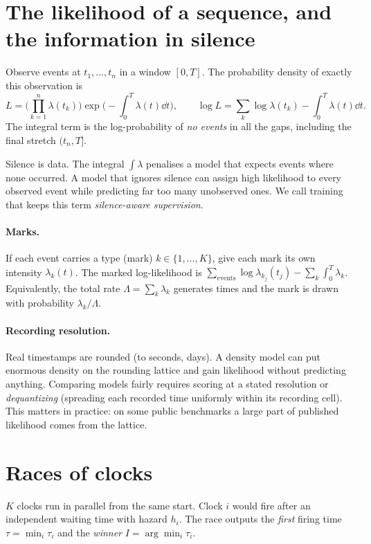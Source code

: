 \documentclass[11pt]{article}
\begin{document}
\section{The likelihood of a sequence, and the information in silence}
Observe events at $t_1,\dots,t_n$ in a window $[0,T]$. The probability density of exactly this observation is
\[
L=\Big(\prod_{k=1}^n \lambda(t_k)\Big)\exp\!\Big(-\int_0^T\lambda(t)\dd t\Big),\qquad
\log L=\sum_{k}\log\lambda(t_k)-\int_0^T\lambda(t)\dd t .
\]
The integral term is the log-probability of \emph{no events} in all the gaps, including the final stretch $(t_n,T]$.

\begin{keyidea}
Silence is data. The integral $\int\lambda$ penalises a model that expects events where none occurred. A model that ignores
silence can assign high likelihood to every observed event while predicting far too many unobserved ones. We call training
that keeps this term \emph{silence-aware supervision}.
\end{keyidea}

\paragraph{Marks.} If each event carries a type (mark) $k\in\{1,\dots,K\}$, give each mark its own intensity $\lambda_k(t)$.
The marked log-likelihood is $\sum_{\text{events}}\log\lambda_{k_j}(t_j)-\sum_k\int_0^T\lambda_k$. Equivalently, the total
rate $\Lambda=\sum_k\lambda_k$ generates times and the mark is drawn with probability $\lambda_k/\Lambda$.

\paragraph{Recording resolution.} Real timestamps are rounded (to seconds, days). A density model can put enormous density on the
rounding lattice and gain likelihood without predicting anything. Comparing models fairly requires scoring at a stated resolution
or \emph{dequantizing} (spreading each recorded time uniformly within its recording cell). This matters in practice: on some
public benchmarks a large part of published likelihood comes from the lattice.

\section{Races of clocks}
\begin{definition}[Race]
$K$ clocks run in parallel from the same start. Clock $i$ would fire after an independent waiting time with hazard $h_i$.
The race outputs the \emph{first} firing time $\tau=\min_i\tau_i$ and the \emph{winner} $I=\arg\min_i\tau_i$.
\end{definition}
\end{document}
